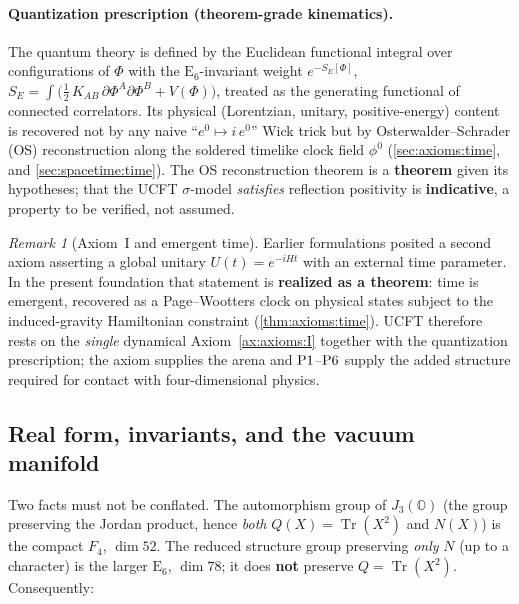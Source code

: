 \documentclass[11pt]{article}
\theoremstyle{plain}
\theoremstyle{definition}
\theoremstyle{remark}
\newtheorem{remark}[theorem]{Remark}
\newcommand{\E}[1]{\mathrm{E}_{#1}}
\newcommand{\Tr}{\operatorname{Tr}}
\newcommand{\jalg}{J_3(\mathbb{O})}
\newcommand{\ESix}{\E{6}}
\newcommand{\Pone}{\textnormal{P1}}
\newcommand{\Psix}{\textnormal{P6}}
\newcommand{\clock}{\phi^{0}}
\begin{document}
\paragraph{Quantization prescription (theorem-grade kinematics).}
The quantum theory is defined by the Euclidean functional integral over
configurations of $\Phi$ with the $\ESix$-invariant weight $e^{-S_E[\Phi]}$,
$S_E=\int\!\bigl(\tfrac12\,K_{\!AB}\,\partial\Phi^A\partial\Phi^B+V(\Phi)\bigr)$,
treated as the generating functional of connected correlators. Its physical
(Lorentzian, unitary, positive-energy) content is recovered not by any naive
``$e^0\mapsto i\,e^0$'' Wick trick but by Osterwalder--Schrader (OS)
reconstruction along the soldered timelike clock field $\clock$
(\autoref{sec:axioms:time}, and \autoref{sec:spacetime:time}). The OS
reconstruction theorem is a \textbf{theorem} given its hypotheses; that the
UCFT $\sigma$-model \emph{satisfies} reflection positivity is
\textbf{indicative}, a property to be verified, not assumed.

\begin{remark}[Axiom~I and emergent time]\label{rem:axioms:honest}
Earlier formulations posited a second axiom asserting a global unitary
$U(t)=e^{-iHt}$ with an external time parameter. In the present foundation
that statement is \textbf{realized as a theorem}: time is emergent, recovered
as a Page--Wootters clock on physical states subject to the induced-gravity
Hamiltonian constraint (\autoref{thm:axioms:time}). UCFT therefore rests on the
\emph{single} dynamical Axiom~\ref{ax:axioms:I} together with the quantization
prescription; the axiom supplies the arena and $\Pone$--$\Psix$ supply the
added structure required for contact with four-dimensional physics.
\end{remark}

\subsection{Real form, invariants, and the vacuum manifold}
\label{sec:axioms:realform}

Two facts must not be conflated. The automorphism group of $\jalg$ (the group
preserving the Jordan product, hence \emph{both} $Q(X)=\Tr(X^2)$ and $N(X)$)
is the compact $F_4$, $\dim 52$. The reduced structure group preserving
\emph{only} $N$ (up to a character) is the larger $\ESix$, $\dim 78$; it does
\textbf{not} preserve $Q=\Tr(X^2)$. Consequently:
\end{document}

